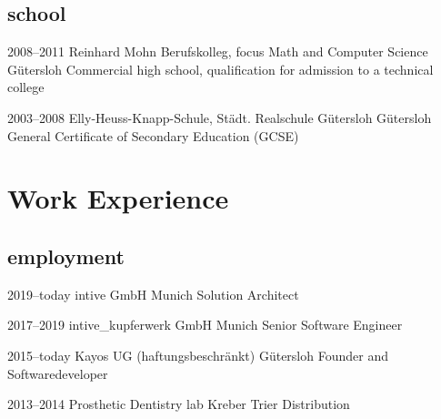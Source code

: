 \documentclass[]{friggeri-cv} %
\begin{document}
\subsection{school}

	\begin{entrylist}
	
	\entry
	{2008--2011}
	{Reinhard Mohn Berufskolleg, focus Math and Computer Science}
	{G\"{u}tersloh}
	{Commercial high school, qualification for admission to a technical college}
	
	
	\entry
	{2003--2008}
	{Elly-Heuss-Knapp-Schule, St\"{a}dt. Realschule G\"{u}tersloh}
	{G\"{u}tersloh}
	{General Certificate of Secondary Education (GCSE)}
	
%	
%	

\end{entrylist}


\section{Work Experience}

\subsection{employment}

	
	\begin{entrylist}
		
	\entry
	{2019--today}
	{intive GmbH}
	{Munich}
	{Solution Architect}
	
	
	\entry
	{2017--2019}
	{intive\_kupferwerk GmbH}
	{Munich}
	{Senior Software Engineer}
		
	
	\entry
	{2015--today}
	{Kayos UG (haftungsbeschr\"{a}nkt)}
	{G\"{u}tersloh}
	{Founder and Softwaredeveloper}

	
	\entry
	{2013--2014}
	{Prosthetic Dentistry lab Kreber}
	{Trier}
	{Distribution}


\end{entrylist}
\end{document}
